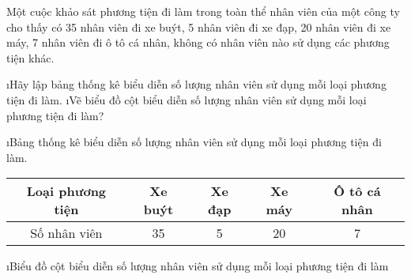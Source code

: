 \begin{bt}
	Một cuộc khảo sát phương tiện đi làm trong toàn thể nhân viên của một công ty cho thấy có  35 nhân viên đi xe buýt, 5  nhân viên đi xe đạp,  20 nhân viên đi xe máy, 7  nhân viên đi ô tô cá nhân, không có nhân viên nào sử dụng các phương tiện khác. 
	\begin{enumerate}[a),leftmargin=*]
		\i Hãy lập bảng thống kê biểu diễn số lượng nhân viên sử dụng mỗi loại phương tiện đi làm.
		\i Vẽ biểu đồ cột biểu diễn số lượng nhân viên sử dụng mỗi loại phương tiện đi làm?
	\end{enumerate}
	\begin{loigiaichuong40}
		\begin{enumerate}[a),leftmargin=*]
			\i Bảng thống kê biểu diễn số lượng nhân viên sử dụng mỗi loại phương tiện đi làm.
			\begin{center}
				\begin{tabular}{|c|c|c|c|c|}
					\hline
					Loại phương tiện&	Xe buýt&	Xe đạp&	Xe máy&	Ô tô cá nhân\\
					\hline
					Số nhân viên& 35 &5&20&7\\
					\hline
				\end{tabular}
			\end{center}	 
			\i Biểu đồ cột biểu diễn số lượng nhân viên sử dụng mỗi loại phương tiện đi làm
		\end{enumerate}
	\end{loigiaichuong40}
\end{bt}

